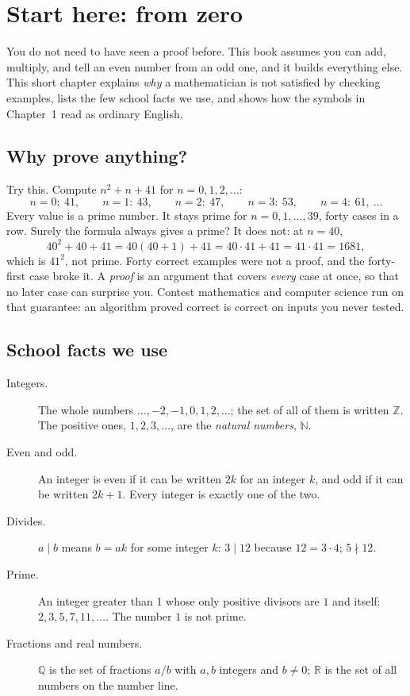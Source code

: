 \chapter*{Start here: from zero}

You do not need to have seen a proof before. This book assumes you can add,
multiply, and tell an even number from an odd one, and it builds everything else.
This short chapter explains \emph{why} a mathematician is not satisfied by
checking examples, lists the few school facts we use, and shows how the symbols
in Chapter~1 read as ordinary English.

\section*{Why prove anything?}

Try this. Compute $n^2+n+41$ for $n=0,1,2,\dots$:
\[
n=0:\ 41,\qquad n=1:\ 43,\qquad n=2:\ 47,\qquad n=3:\ 53,\qquad n=4:\ 61,\ \dots
\]
Every value is a prime number. It stays prime for $n=0,1,\dots,39$, forty cases in
a row. Surely the formula always gives a prime? It does not: at $n=40$,
\[
40^2+40+41 = 40(40+1)+41 = 40\cdot 41 + 41 = 41\cdot 41 = 1681,
\]
which is $41^2$, not prime. Forty correct examples were not a proof, and the
forty-first case broke it. A \emph{proof} is an argument that covers \emph{every}
case at once, so that no later case can surprise you. Contest mathematics and
computer science run on that guarantee: an algorithm proved correct is correct on
inputs you never tested.

\section*{School facts we use}

\begin{description}
\item[Integers.] The whole numbers $\dots,-2,-1,0,1,2,\dots$; the set of all of
      them is written $\mathbb Z$. The positive ones, $1,2,3,\dots$, are the
      \emph{natural numbers}, $\mathbb N$.
\item[Even and odd.] An integer is even if it can be written $2k$ for an
      integer $k$, and odd if it can be written $2k+1$. Every integer is exactly
      one of the two.
\item[Divides.] $a\mid b$ means $b=ak$ for some integer $k$: $3\mid 12$ because
      $12=3\cdot4$; $5\nmid 12$.
\item[Prime.] An integer greater than 1 whose only positive divisors are $1$ and
      itself: $2,3,5,7,11,\dots$. The number $1$ is not prime.
\item[Fractions and real numbers.] $\mathbb Q$ is the set of fractions $a/b$ with
      $a,b$ integers and $b\ne0$; $\mathbb R$ is the set of all numbers on the
      number line.
\end{description}

